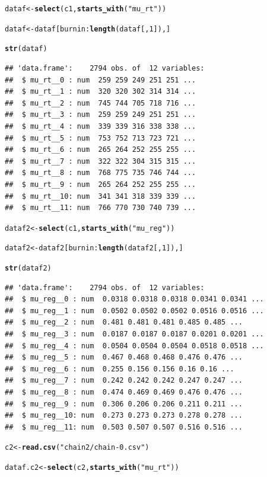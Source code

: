 \documentclass{article}\usepackage[]{graphicx}\usepackage[]{color}
\makeatletter
\newcommand{\hlnum}[1]{\textcolor[rgb]{0.686,0.059,0.569}{#1}}%
\newcommand{\hlstr}[1]{\textcolor[rgb]{0.192,0.494,0.8}{#1}}%
\newcommand{\hlopt}[1]{\textcolor[rgb]{0,0,0}{#1}}%
\newcommand{\hlstd}[1]{\textcolor[rgb]{0.345,0.345,0.345}{#1}}%
\newcommand{\hlkwb}[1]{\textcolor[rgb]{0.69,0.353,0.396}{#1}}%
\newcommand{\hlkwd}[1]{\textcolor[rgb]{0.737,0.353,0.396}{\textbf{#1}}}%
\newenvironment{kframe}{%
 \def\at@end@of@kframe{}%
 \ifinner\ifhmode%
  \def\at@end@of@kframe{\end{minipage}}%
  \begin{minipage}{\columnwidth}%
 \fi\fi%
 \def\FrameCommand##1{\hskip\@totalleftmargin \hskip-\fboxsep
 \colorbox{shadecolor}{##1}\hskip-\fboxsep
     \hskip-\linewidth \hskip-\@totalleftmargin \hskip\columnwidth}%
 \MakeFramed {\advance\hsize-\width
   \@totalleftmargin\z@ \linewidth\hsize
   \@setminipage}}%
 {\par\unskip\endMakeFramed%
 \at@end@of@kframe}
\newenvironment{knitrout}{}{} %
\makeatother
\begin{document}
\begin{knitrout}
\begin{kframe}
\begin{alltt}
\hlstd{dataf} \hlkwb{<-} \hlkwd{select}\hlstd{(c1,} \hlkwd{starts_with}\hlstd{(}\hlstr{"mu_rt"}\hlstd{))}

\hlstd{dataf} \hlkwb{<-} \hlstd{dataf[burnin}\hlopt{:}\hlkwd{length}\hlstd{(dataf[,} \hlnum{1}\hlstd{]), ]}

\hlkwd{str}\hlstd{(dataf)}
\end{alltt}
\begin{verbatim}
## 'data.frame':	2794 obs. of  12 variables:
##  $ mu_rt__0 : num  259 259 249 251 251 ...
##  $ mu_rt__1 : num  320 320 302 314 314 ...
##  $ mu_rt__2 : num  745 744 705 718 716 ...
##  $ mu_rt__3 : num  259 259 249 251 251 ...
##  $ mu_rt__4 : num  339 339 316 338 338 ...
##  $ mu_rt__5 : num  753 752 713 723 721 ...
##  $ mu_rt__6 : num  265 264 252 255 255 ...
##  $ mu_rt__7 : num  322 322 304 315 315 ...
##  $ mu_rt__8 : num  768 775 735 746 744 ...
##  $ mu_rt__9 : num  265 264 252 255 255 ...
##  $ mu_rt__10: num  341 341 318 339 339 ...
##  $ mu_rt__11: num  766 770 730 740 739 ...
\end{verbatim}
\begin{alltt}
\hlstd{dataf2} \hlkwb{<-} \hlkwd{select}\hlstd{(c1,} \hlkwd{starts_with}\hlstd{(}\hlstr{"mu_reg"}\hlstd{))}

\hlstd{dataf2} \hlkwb{<-} \hlstd{dataf2[burnin}\hlopt{:}\hlkwd{length}\hlstd{(dataf2[,} \hlnum{1}\hlstd{]), ]}

\hlkwd{str}\hlstd{(dataf2)}
\end{alltt}
\begin{verbatim}
## 'data.frame':	2794 obs. of  12 variables:
##  $ mu_reg__0 : num  0.0318 0.0318 0.0318 0.0341 0.0341 ...
##  $ mu_reg__1 : num  0.0502 0.0502 0.0502 0.0516 0.0516 ...
##  $ mu_reg__2 : num  0.481 0.481 0.481 0.485 0.485 ...
##  $ mu_reg__3 : num  0.0187 0.0187 0.0187 0.0201 0.0201 ...
##  $ mu_reg__4 : num  0.0504 0.0504 0.0504 0.0518 0.0518 ...
##  $ mu_reg__5 : num  0.467 0.468 0.468 0.476 0.476 ...
##  $ mu_reg__6 : num  0.255 0.156 0.156 0.16 0.16 ...
##  $ mu_reg__7 : num  0.242 0.242 0.242 0.247 0.247 ...
##  $ mu_reg__8 : num  0.474 0.469 0.469 0.476 0.476 ...
##  $ mu_reg__9 : num  0.306 0.206 0.206 0.211 0.211 ...
##  $ mu_reg__10: num  0.273 0.273 0.273 0.278 0.278 ...
##  $ mu_reg__11: num  0.503 0.507 0.507 0.516 0.516 ...
\end{verbatim}
\begin{alltt}
\hlstd{c2} \hlkwb{<-} \hlkwd{read.csv}\hlstd{(}\hlstr{"chain2/chain-0.csv"}\hlstd{)}

\hlstd{dataf.c2} \hlkwb{<-} \hlkwd{select}\hlstd{(c2,} \hlkwd{starts_with}\hlstd{(}\hlstr{"mu_rt"}\hlstd{))}


\end{alltt}
\end{kframe}
\end{knitrout}
\end{document}
